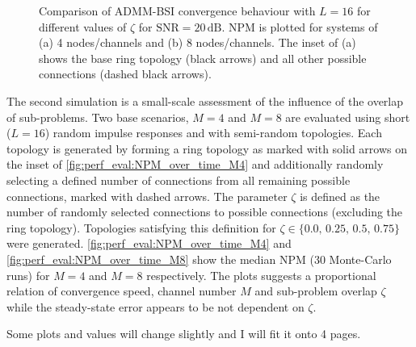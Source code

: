 \documentclass{article}
\begin{document}
\begin{figure}[t]
    \centering
    \hspace*{-0.2cm}
    \hspace*{-0.0cm}
    \vspace*{-0.2cm}
    \caption[Comparison of ADMM-BSI convergence behaviour with \(L\!=\!16\) for different values of \(\zeta\)]{Comparison of ADMM-BSI convergence behaviour with \(L\!=\!16\) for different values of \(\zeta\) for \(\text{SNR}=20\,\text{dB}\). NPM is plotted for systems of (a) 4 nodes/channels and (b) 8 nodes/channels. The inset of (a) shows the base ring topology (black arrows) and all other possible connections (dashed black arrows).}
    \label{fig:perf_eval:NPM_over_time_exp2}
\end{figure}

The second simulation is a small-scale assessment of the influence of the overlap of sub-problems.
Two base scenarios, \(M=4\) and \(M=8\) are evaluated using short (\(L=16\)) random impulse responses and with semi-random topologies.
Each topology is generated by forming a ring topology as marked with solid arrows on the inset of \autoref{fig:perf_eval:NPM_over_time_M4} and additionally randomly selecting a defined number of connections from all remaining possible connections, marked with dashed arrows.
The parameter \(\zeta\) is defined as the number of randomly selected connections to possible connections (excluding the ring topology). Topologies satisfying this definition for \(\zeta \in \{0.0,\,0.25,\,0.5,\,0.75\}\) were generated.
\autoref{fig:perf_eval:NPM_over_time_M4} and \autoref{fig:perf_eval:NPM_over_time_M8} show the median NPM (30 Monte-Carlo runs) for \(M=4\) and \(M=8\) respectively. The plots suggests a proportional relation of convergence speed, channel number \(M\) and sub-problem overlap \(\zeta\) while the steady-state error appears to be not dependent on \(\zeta\).
\begin{attention}
    Some plots and values will change slightly and I will fit it onto 4 pages.
\end{attention}
\end{document}
